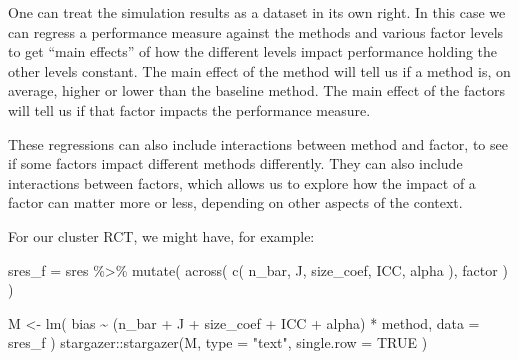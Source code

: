 \documentclass[
]{book}
\newenvironment{Shaded}{\begin{snugshade}}{\end{snugshade}}
\newcommand{\AttributeTok}[1]{\textcolor[rgb]{0.77,0.63,0.00}{#1}}
\newcommand{\ConstantTok}[1]{\textcolor[rgb]{0.00,0.00,0.00}{#1}}
\newcommand{\FunctionTok}[1]{\textcolor[rgb]{0.00,0.00,0.00}{#1}}
\newcommand{\NormalTok}[1]{#1}
\newcommand{\OtherTok}[1]{\textcolor[rgb]{0.56,0.35,0.01}{#1}}
\newcommand{\SpecialCharTok}[1]{\textcolor[rgb]{0.00,0.00,0.00}{#1}}
\newcommand{\StringTok}[1]{\textcolor[rgb]{0.31,0.60,0.02}{#1}}
\begin{document}
One can treat the simulation results as a dataset in its own right.
In this case we can regress a performance measure against the methods and various factor levels to get ``main effects'' of how the different levels impact performance holding the other levels constant.
The main effect of the method will tell us if a method is, on average, higher or lower than the baseline method.
The main effect of the factors will tell us if that factor impacts the performance measure.

These regressions can also include interactions between method and factor, to see if some factors impact different methods differently.
They can also include interactions between factors, which allows us to explore how the impact of a factor can matter more or less, depending on other aspects of the context.

For our cluster RCT, we might have, for example:

\begin{Shaded}
\begin{Highlighting}[]
\NormalTok{sres\_f }\OtherTok{=}\NormalTok{ sres }\SpecialCharTok{\%\textgreater{}\%}
  \FunctionTok{mutate}\NormalTok{( }\FunctionTok{across}\NormalTok{( }\FunctionTok{c}\NormalTok{( n\_bar, J, size\_coef, ICC, alpha ), factor ) )}

\NormalTok{M }\OtherTok{\textless{}{-}} \FunctionTok{lm}\NormalTok{( bias }\SpecialCharTok{\textasciitilde{}}\NormalTok{ (n\_bar }\SpecialCharTok{+}\NormalTok{ J }\SpecialCharTok{+}\NormalTok{ size\_coef }\SpecialCharTok{+}\NormalTok{ ICC }\SpecialCharTok{+}\NormalTok{ alpha) }\SpecialCharTok{*}\NormalTok{ method, }
         \AttributeTok{data =}\NormalTok{ sres\_f )}
\NormalTok{stargazer}\SpecialCharTok{::}\FunctionTok{stargazer}\NormalTok{(M, }\AttributeTok{type =} \StringTok{"text"}\NormalTok{,}
                     \AttributeTok{single.row =} \ConstantTok{TRUE}\NormalTok{ )}
\end{Highlighting}
\end{Shaded}
\end{document}
